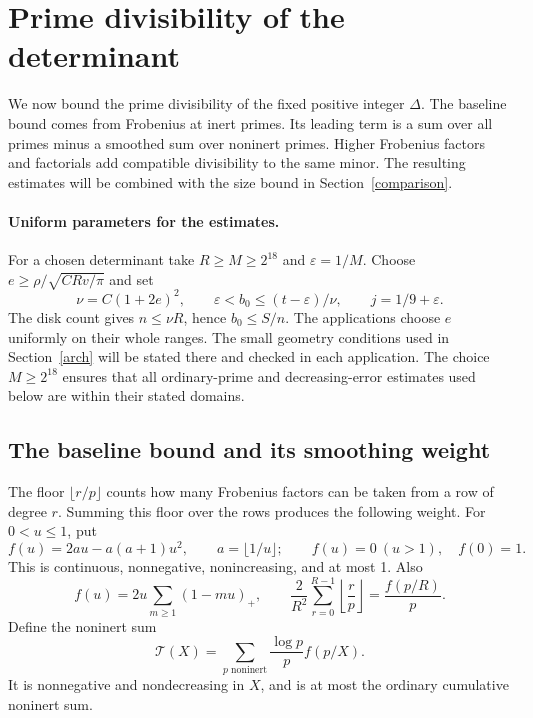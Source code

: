 \documentclass[11pt]{article}
\newcommand{\Tn}{\mathcal T}
\newcommand{\eps}{\varepsilon}
\begin{document}
\section{Prime divisibility of the determinant}\label{divisibility}
We now bound the prime divisibility of the fixed positive integer
\(\Delta\). The baseline bound comes from Frobenius at inert primes.
Its leading term is a sum over all primes minus a smoothed sum over
noninert primes. Higher Frobenius factors and factorials add compatible
divisibility to the same minor. The resulting estimates will be combined
with the size bound in Section~\ref{comparison}.

\paragraph{Uniform parameters for the estimates.}
For a chosen determinant take \(R\ge M\ge2^{18}\) and
\(\eps=1/M\). Choose \(e\ge\rho/\sqrt{CRv/\pi}\) and set
\[
 \nu=C(1+2e)^2,\qquad
 \eps<b_0\le(t-\eps)/\nu,\qquad j=1/9+\eps.
\]
The disk count gives \(n\le\nu R\), hence \(b_0\le S/n\).
The applications choose \(e\) uniformly on their whole ranges.
The small geometry conditions used in Section~\ref{arch} will be
stated there and checked in each application. The choice \(M\ge2^{18}\)
ensures that all ordinary-prime and decreasing-error estimates used below
are within their stated domains.

\subsection{The baseline bound and its smoothing weight}
The floor \(\lfloor r/p\rfloor\) counts how many Frobenius factors
can be taken from a row of degree \(r\). Summing this floor over the
rows produces the following weight.
For \(0<u\le1\), put
\begin{equation}\label{fdef}
 f(u)=2au-a(a+1)u^2,\qquad a=\lfloor1/u\rfloor;
 \qquad f(u)=0\ (u>1),\quad f(0)=1.
\end{equation}
This is continuous, nonnegative, nonincreasing, and at most 1. Also
\begin{equation}\label{fidentity}
 f(u)=2u\sum_{m\ge1}(1-mu)_+,\qquad
 \frac2{R^2}\sum_{r=0}^{R-1}\left\lfloor\frac rp\right\rfloor
       =\frac{f(p/R)}p.
\end{equation}
Define the noninert sum
\begin{equation}\label{Tdef}
 \Tn(X)=\sum_{p\text{ noninert}}\frac{\log p}{p}f(p/X).
\end{equation}
It is nonnegative and nondecreasing in \(X\), and is at most the
ordinary cumulative noninert sum.
\end{document}
